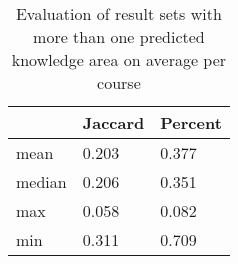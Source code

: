 
\begin{table}[ht]
\centering
\begin{tabular}{lll}
\toprule
& Jaccard & Percent \\
\midrule
mean   & 0.203 & 0.377\\
median & 0.206 & 0.351\\
\midrule
max    & 0.058 & 0.082\\
min    & 0.311 & 0.709\\
\bottomrule
\end{tabular}
\caption{Evaluation of result sets with more than one predicted knowledge area on average per course\label{tbl:evaluation-after}}
\end{table}


